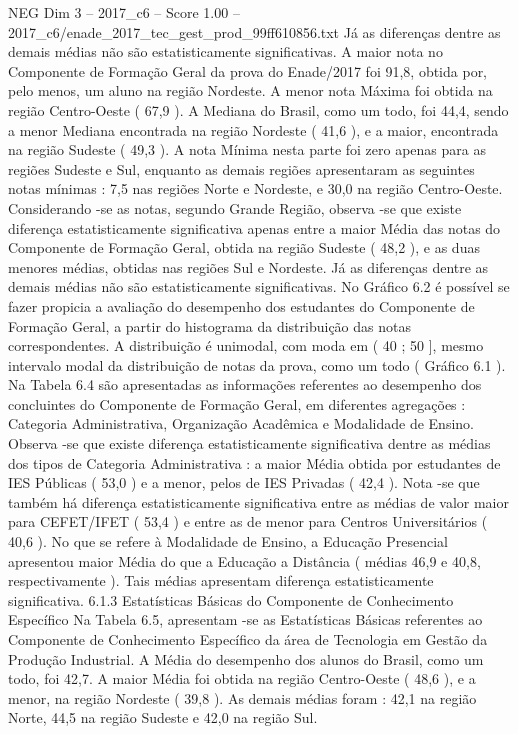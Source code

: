 \begin{textsample}{NEG Dim 3 – 2017\_c6 – Score 1.00 – 2017\_c6/enade\_2017\_tec\_gest\_prod\_99ff610856.txt}
Já as diferenças dentre as demais médias não são estatisticamente significativas.
A maior nota no Componente de Formação Geral da prova do Enade/2017 foi 91,8, obtida por, pelo menos, um aluno na região Nordeste.
A menor nota Máxima foi obtida na região Centro-Oeste ( 67,9 ).
A Mediana do Brasil, como um todo, foi 44,4, sendo a menor Mediana encontrada na região Nordeste ( 41,6 ), e a maior, encontrada na região Sudeste ( 49,3 ).
A nota Mínima nesta parte foi zero apenas para as regiões Sudeste e Sul, enquanto as demais regiões apresentaram as seguintes notas mínimas : 7,5 nas regiões Norte e Nordeste, e 30,0 na região Centro-Oeste.
Considerando -se as notas, segundo Grande Região, observa -se que existe diferença estatisticamente significativa apenas entre a maior Média das notas do Componente de Formação Geral, obtida na região Sudeste ( 48,2 ), e as duas menores médias, obtidas nas regiões Sul e Nordeste.
Já as diferenças dentre as demais médias não são estatisticamente significativas.
No Gráfico 6.2 é possível se fazer propicia a avaliação do desempenho dos estudantes do Componente de Formação Geral, a partir do histograma da distribuição das notas correspondentes.
A distribuição é unimodal, com moda em ( 40 ; 50 ], mesmo intervalo modal da distribuição de notas da prova, como um todo ( Gráfico 6.1 ).
Na Tabela 6.4 são apresentadas as informações referentes ao desempenho dos concluintes do Componente de Formação Geral, em diferentes agregações : Categoria Administrativa, Organização Acadêmica e Modalidade de Ensino.
Observa -se que existe diferença estatisticamente significativa dentre as médias dos tipos de Categoria Administrativa : a maior Média obtida por estudantes de IES Públicas ( 53,0 ) e a menor, pelos de IES Privadas ( 42,4 ).
Nota -se que também há diferença estatisticamente significativa entre as médias de valor maior para CEFET/IFET ( 53,4 ) e entre as de menor para Centros Universitários ( 40,6 ).
No que se refere à Modalidade de Ensino, a Educação Presencial apresentou maior Média do que a Educação a Distância ( médias 46,9 e 40,8, respectivamente ).
Tais médias apresentam diferença estatisticamente significativa. 6.1.3 Estatísticas Básicas do Componente de Conhecimento Específico Na Tabela 6.5, apresentam -se as Estatísticas Básicas referentes ao Componente de Conhecimento Específico da área de Tecnologia em Gestão da Produção Industrial.
A Média do desempenho dos alunos do Brasil, como um todo, foi 42,7.
A maior Média foi obtida na região Centro-Oeste ( 48,6 ), e a menor, na região Nordeste ( 39,8 ).
As demais médias foram : 42,1 na região Norte, 44,5 na região Sudeste e 42,0 na região Sul.

\end{textsample}
